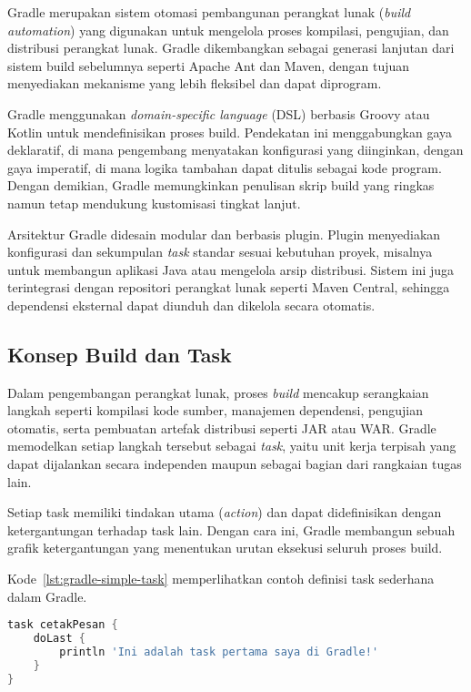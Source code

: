 
Gradle merupakan sistem otomasi pembangunan perangkat lunak (\textit{build automation}) yang digunakan untuk mengelola proses kompilasi, pengujian, dan distribusi perangkat lunak. Gradle dikembangkan sebagai generasi lanjutan dari sistem build sebelumnya seperti Apache Ant dan Maven, dengan tujuan menyediakan mekanisme yang lebih fleksibel dan dapat diprogram.  

Gradle menggunakan \textit{domain-specific language} (DSL) berbasis Groovy atau Kotlin untuk mendefinisikan proses build. Pendekatan ini menggabungkan gaya deklaratif, di mana pengembang menyatakan konfigurasi yang diinginkan, dengan gaya imperatif, di mana logika tambahan dapat ditulis sebagai kode program. Dengan demikian, Gradle memungkinkan penulisan skrip build yang ringkas namun tetap mendukung kustomisasi tingkat lanjut.  

Arsitektur Gradle didesain modular dan berbasis plugin. Plugin menyediakan konfigurasi dan sekumpulan \textit{task} standar sesuai kebutuhan proyek, misalnya untuk membangun aplikasi Java atau mengelola arsip distribusi. Sistem ini juga terintegrasi dengan repositori perangkat lunak seperti Maven Central, sehingga dependensi eksternal dapat diunduh dan dikelola secara otomatis.

\subsection{Konsep Build dan Task}
Dalam pengembangan perangkat lunak, proses \textit{build} mencakup serangkaian langkah seperti kompilasi kode sumber, manajemen dependensi, pengujian otomatis, serta pembuatan artefak distribusi seperti JAR atau WAR. Gradle memodelkan setiap langkah tersebut sebagai \textit{task}, yaitu unit kerja terpisah yang dapat dijalankan secara independen maupun sebagai bagian dari rangkaian tugas lain.  

Setiap task memiliki tindakan utama (\textit{action}) dan dapat didefinisikan dengan ketergantungan terhadap task lain. Dengan cara ini, Gradle membangun sebuah grafik ketergantungan yang menentukan urutan eksekusi seluruh proses build.  

Kode~\ref{lst:gradle-simple-task} memperlihatkan contoh definisi task sederhana dalam Gradle.

\begin{lstlisting}[language=groovy, caption=Contoh task sederhana dalam Gradle, label=lst:gradle-simple-task]
task cetakPesan {
    doLast {
        println 'Ini adalah task pertama saya di Gradle!'
    }
}
\end{lstlisting}


